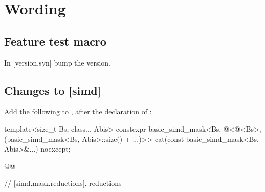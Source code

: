 \section{Wording}\label{sec:wording}
\subsection{Feature test macro}

In [version.syn] bump the  version.

\subsection{Changes to {[simd]}}
\def\rSec#1[#2]#3{%
  \ifcase#1\wgSubsection[subsection]{#3}{#2}
  \or\wgSubsubsection[subsubsection]{#3}{#2}
  \or\wgSubsubsubsection[paragraph]{#3}{#2}
  \or\error
\fi}

Add the following to , after the declaration of :
\begin{wgText}
\begin{codeblock}
  template<size_t Bs, class... Abis>
    constexpr basic_simd_mask<Bs, @\deducet@<@\integerfrom@<Bs>,
                              (basic_simd_mask<Bs, Abis>::size() + ...)>>
      cat(const basic_simd_mask<Bs, Abis>&...) noexcept;

  @@

  // [simd.mask.reductions],  reductions
\end{codeblock}
\end{wgText}

